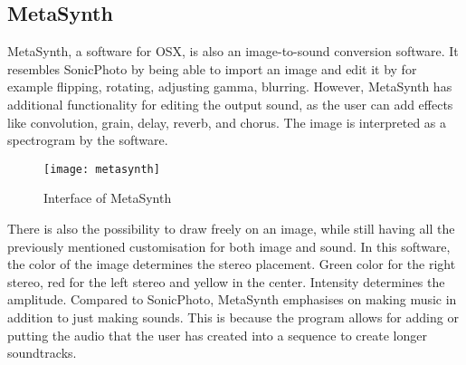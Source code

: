 \subsection{MetaSynth}\label{sub:metasynth}
MetaSynth, a software for OSX, is also an image-to-sound conversion software. It resembles SonicPhoto by being able to import an image and edit it by for example flipping, rotating, adjusting gamma, blurring. However, MetaSynth has additional functionality for editing the output sound, as the user can add effects like  convolution, grain, delay, reverb, and chorus. The image is interpreted as a spectrogram by the software.

\begin{figure}[!h] 
\centering
\texttt{[image: metasynth]}
\caption{\label{fig:metasynth} Interface of MetaSynth \cite{UISoftware2014}}
\end{figure}

There is also the possibility to draw freely on an image, while still having all the previously mentioned customisation for both image and sound. In this software, the color of the image determines the stereo placement. Green color for the right stereo, red for the left stereo and yellow in the center. Intensity determines the amplitude. 
Compared to SonicPhoto, MetaSynth emphasises on making music in addition to just making sounds. This is because the program allows for adding or putting the audio that the user has created into a sequence to create longer soundtracks.